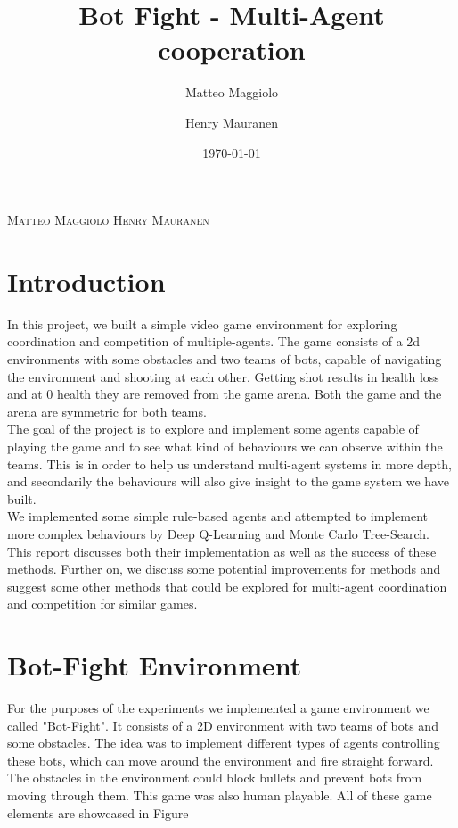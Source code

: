 \documentclass{article}
\title{Bot Fight - Multi-Agent cooperation}
\author{Matteo Maggiolo \and Henry Mauranen}
\date{\today}
\begin{document}
	
	\makeatletter
	\begin{center}
		{\scshape\LARGE{\@title}\par}
		{\scshape\normalsize Matteo Maggiolo \hspace{2cm} Henry Mauranen \par}
		{\scshape\normalsize\@date\par}
	\end{center}
	\makeatother
	
	\section{Introduction}
	In this project, we built a simple video game environment for exploring coordination and competition of multiple-agents. The game consists of a 2d environments with some obstacles and two teams of bots, capable of navigating the environment and shooting at each other. Getting shot results in health loss and at 0 health they are removed from the game arena. Both the game and the arena are symmetric for both teams. \\
	The goal of the project is to explore and implement some agents capable of playing the game and to see what kind of behaviours we can observe within the teams. This is in order to help us understand multi-agent systems in more depth, and secondarily the behaviours will also give insight to the game system we have built. \\
	We implemented some simple rule-based agents and attempted to implement more complex behaviours by Deep Q-Learning and Monte Carlo Tree-Search. This report discusses both their implementation as well as the success of these methods. Further on, we discuss some potential improvements for methods and suggest some other methods that could be explored for multi-agent coordination and competition for similar games.
	
	
	\section{Bot-Fight Environment}
	For the purposes of the experiments we implemented a game environment we called "Bot-Fight". It consists of a 2D environment with two teams of bots and some obstacles. The idea was to implement different types of agents controlling these bots, which can move around the environment and fire straight forward. The obstacles in the environment could block bullets and prevent bots from moving through them. This game was also human playable. All of these game elements are showcased in Figure 
	
\end{document}
